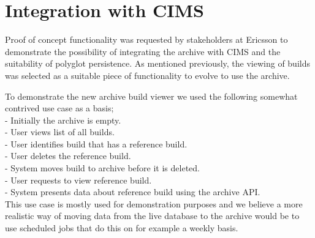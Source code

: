 %
%

\section{Integration with CIMS}
Proof of concept functionality was requested by stakeholders at Ericsson to demonstrate the possibility of integrating the archive with CIMS and the suitability of polyglot persistence. As mentioned previously, the viewing of builds was selected as a suitable piece of functionality to evolve to use the archive. 

To demonstrate the new archive build viewer we used the following somewhat contrived use case as a basis; \\
- Initially the archive is empty. \\
- User views list of all builds. \\
- User identifies build that has a reference build. \\
- User deletes the reference build.  \\
- System moves build to archive before it is deleted.  \\
- User requests to view reference build. \\
- System presents data about reference build using the archive API. \\

This use case is mostly used for demonstration purposes and we believe a more realistic way of moving data from the live database to the archive would be to use scheduled jobs that do this on for example a weekly basis.

